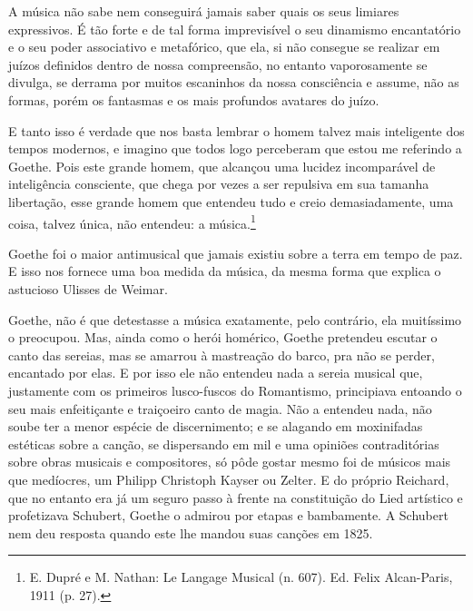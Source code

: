 A música não sabe nem conseguirá jamais saber quais os seus limiares
expressivos. É tão forte e de tal forma imprevisível o seu dinamismo
encantatório e o seu poder associativo e metafórico, que ela, si não
consegue se realizar em juízos definidos dentro de nossa compreensão, no
entanto vaporosamente se divulga, se derrama por muitos escaninhos da
nossa consciência e assume, não as formas, porém os fantasmas e os mais
profundos avatares do juízo.

E tanto isso é verdade que nos basta lembrar o homem talvez mais
inteligente dos tempos modernos, e imagino que todos logo perceberam que
estou me referindo a Goethe. Pois este grande homem, que alcançou uma
lucidez incomparável de inteligência consciente, que chega por vezes a
ser repulsiva em sua tamanha libertação, esse grande homem que entendeu
tudo e creio demasiadamente, uma coisa, talvez única, não entendeu: a
música.\footnote{E. Dupré e M. Nathan: Le Langage Musical (n. 607). Ed. Felix
Alcan-Paris, 1911 (p. 27).}

Goethe foi o maior antimusical que jamais existiu sobre a terra em tempo
de paz. E isso nos fornece uma boa medida da música, da mesma forma que
explica o astucioso Ulisses de Weimar.

Goethe, não é que detestasse a música exatamente, pelo contrário, ela
muitíssimo o preocupou. Mas, ainda como o herói homérico, Goethe
pretendeu escutar o canto das sereias, mas se amarrou à mastreação do
barco, pra não se perder, encantado por elas. E por isso ele não
entendeu nada a sereia musical que, justamente com os primeiros
lusco-fuscos do Romantismo, principiava entoando o seu mais enfeitiçante
e traiçoeiro canto de magia. Não a entendeu nada, não soube ter a menor
espécie de discernimento; e se alagando em moxinifadas estéticas sobre a
canção, se dispersando em mil e uma opiniões contraditórias sobre obras
musicais e compositores, só pôde gostar mesmo foi de músicos mais que
medíocres, um Philipp Christoph Kayser ou Zelter. E do próprio Reichard,
que no entanto era já um seguro passo à frente na constituição do Lied
artístico e profetizava Schubert, Goethe o admirou por etapas e
bambamente. A Schubert nem deu resposta quando este lhe mandou suas
canções em 1825.

